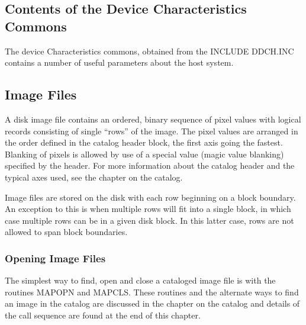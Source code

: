 \subsection{Contents of the Device Characteristics Commons }
The device Characteristics commons, obtained from the INCLUDE DDCH.INC
contains a number of useful parameters about the host system.

\subsection{Image Files}
A disk image file contains an ordered, binary sequence of pixel values
with logical records consisting of single ``rows'' of the image. The
pixel values are arranged in the order defined in the catalog header
block, the first axis going the fastest.  Blanking of pixels is
allowed by use of a special value (magic value blanking) specified by
the header.  For more information about the catalog header and the
typical axes used, see the chapter on the catalog.

Image files are stored on the disk with each row beginning on a block
boundary.  An exception to this is when multiple rows will fit into a
single block, in which case multiple rows can be in a given disk
block.  In this latter case, rows are not allowed to span block
boundaries.

\subsubsection{Opening Image Files}
The simplest way to find, open and close a cataloged image file is
with the routines MAPOPN and MAPCLS.  These routines and the
alternate ways to find an image in the catalog are discussed in the
chapter on the catalog and details of the call sequence are found at
the end of this chapter.

